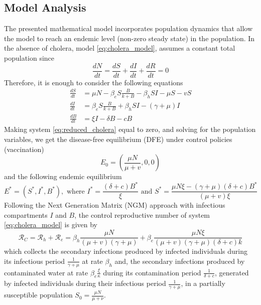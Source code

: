 \documentclass{book}
\begin{document}
\subsection*{Model Analysis}
The presented mathematical model incorporates population dynamics that allow the model to reach an endemic level (non-zero steady state) in the population.
In the absence of cholera, model \eqref{eq:cholera_model}, assumes a constant total population since
$$
\frac{d N}{d t}=\frac{d S}{d t}+\frac{d I}{d t}+\frac{d R}{d t}=0
$$
Therefore, it is enough to consider the following equations
\begin{equation} \label{eq:reduced_cholera}
\begin{aligned}
\frac{d S}{d t} &=\mu N-\beta_{e} S \frac{B}{k+B}-\beta_{h} S I-\mu S-v S \\
\frac{d I}{d t} &=\beta_{e} S \frac{B}{k+B}+\beta_{h} S I-(\gamma+\mu) I \\
\frac{d B}{d t} &=\xi I-\delta B-c B
\end{aligned}
\end{equation}
%
Making system \eqref{eq:reduced_cholera} equal to zero, and solving for the population variables, we get the disease-free equilibrium (DFE) under control policies (vaccination)
\begin{equation}
E_{0}=\left(\frac{\mu N}{\mu+v}, 0,0\right)
\end{equation}
and the following endemic equilibrium
$$
E^{*}=\left(S^{*}, I^{*}, B^{*}\right), \text { where } I^{*}=\frac{(\delta+c) B^{*}}{\xi} \text { and } S^{*}=\frac{\mu N \xi-(\gamma+\mu)(\delta+c) B^{*}}{(\mu+v) \xi}
$$
Following the Next Generation Matrix (NGM) approach with infectious compartments $I$ and $B$, the control reproductive number of system \eqref{eq:cholera_model} is given by
\begin{equation}
\mathcal{R}_C=\mathcal{R}_h+\mathcal{R}_e=\beta_{h} \frac{\mu N}{(\mu+v)(\gamma+\mu)}+\beta_{e} \frac{\mu N \xi}{(\mu+v)(\gamma+\mu)(\delta+c) k}
\end{equation}
which collects the secondary infections produced by infected individuals during its infectious period $\frac{1}{\gamma+\mu}$ at rate $\beta_h$ and, the secondary infections produced by contaminated water at rate $\beta_e \frac{\xi}{\kappa}$ during its contamination period $\frac{1}{\delta+c}$, generated by infected individuals during their infectious period $\frac{1}{\gamma+\mu}$, in a partially susceptible population $S_0=\frac{\mu N}{\mu+\nu}$.
\end{document}
